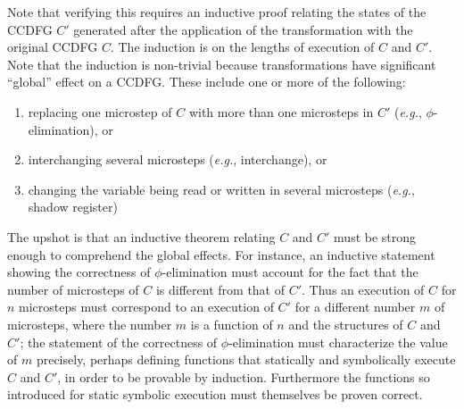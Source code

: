 Note that verifying this requires an inductive proof
relating the states of the CCDFG $C'$ generated after the
application of the transformation with the original CCDFG
$C$.  The induction is on the lengths of execution of $C$
and $C'$.  Note that the induction is non-trivial because
transformations have significant ``global'' effect on a
CCDFG.  These include one or more of the following:

\begin{enumerate}
\item replacing one microstep of $C$ with more than one
  microsteps in $C'$ ({\em e.g.}, $\phi$-elimination), or
\item interchanging several microsteps ({\em e.g.},
  interchange), or
\item changing the variable being read or written in several
  microsteps ({\em e.g.}, shadow register)
\end{enumerate}
The upshot is that an inductive theorem relating $C$ and
$C'$ must be strong enough to comprehend the global effects.
For instance, an inductive statement showing the
correctness of $\phi$-elimination must account for the fact
that the number of microsteps of $C$ is different from that
of $C'$.  Thus an execution of $C$ for $n$ microsteps must
correspond to an execution of $C'$ for a different number
$m$ of microsteps, where the number $m$ is a function of $n$
and the structures of $C$ and $C'$; the statement of the
correctness of $\phi$-elimination must characterize the
value of $m$ precisely, perhaps defining functions that
statically and symbolically execute $C$ and $C'$, in order
to be provable by induction.  Furthermore the functions so
introduced for static symbolic execution must themselves be
proven correct.



 
